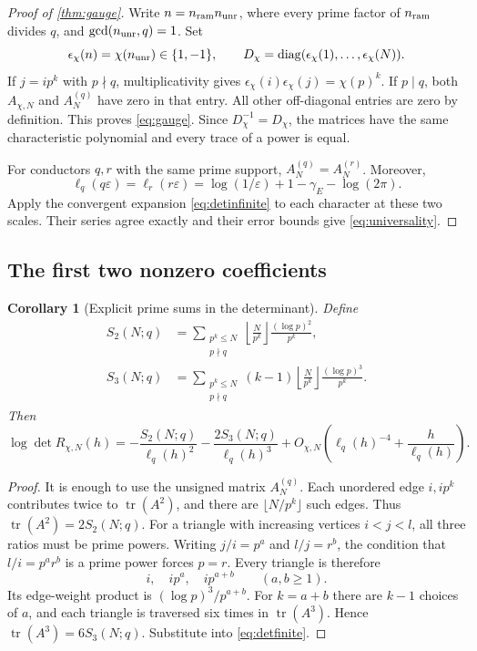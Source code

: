 \documentclass[11pt]{article}
\newtheorem{corollary}[theorem]{Corollary}
\theoremstyle{definition}
\newcommand{\tr}{\operatorname{tr}}
\newcommand{\diag}{\operatorname{diag}}
\newcommand{\gE}{\gamma_{\!E}}
\begin{document}
\begin{proof}[Proof of \cref{thm:gauge}]
Write $n=n_{\rm ram}n_{\rm unr}$, where every prime factor of $n_{\rm ram}$
divides $q$, and $\gcd(n_{\rm unr},q)=1$. Set
\[
 \epsilon_\chi(n)=\chi(n_{\rm unr})\in\{1,-1\},\qquad
 D_\chi=\diag(\epsilon_\chi(1),\ldots,\epsilon_\chi(N)).
\]
If $j=i p^k$ with $p\nmid q$, multiplicativity gives
$\epsilon_\chi(i)\epsilon_\chi(j)=\chi(p)^k$.
If $p\mid q$, both $A_{\chi,N}$ and $A_N^{(q)}$ have zero in that entry.
All other off-diagonal entries are zero by definition. This proves
\cref{eq:gauge}. Since $D_\chi^{-1}=D_\chi$, the matrices have the same
characteristic polynomial and every trace of a power is equal.

For conductors $q,r$ with the same prime support, $A_N^{(q)}=A_N^{(r)}$.
Moreover,
\[
 \ell_q(q\varepsilon)=\ell_r(r\varepsilon)
 =\log(1/\varepsilon)+1-\gE-\log(2\pi).
\]
Apply the convergent expansion \cref{eq:detinfinite} to each character at these
two scales. Their series agree exactly and their error bounds give
\cref{eq:universality}.
\end{proof}

\subsection{The first two nonzero coefficients}

\begin{corollary}[Explicit prime sums in the determinant]\label{cor:coeff}
Define
\begin{align*}
 S_2(N;q)&=\sum_{\substack{p^k\le N\\p\nmid q}}
       \left\lfloor\frac N{p^k}\right\rfloor\frac{(\log p)^2}{p^k},\\
 S_3(N;q)&=\sum_{\substack{p^k\le N\\p\nmid q}}
       (k-1)\left\lfloor\frac N{p^k}\right\rfloor\frac{(\log p)^3}{p^k}.
\end{align*}
Then
\begin{equation}\label{eq:firstcoeff}
 \log\det R_{\chi,N}(h)
 =-\frac{S_2(N;q)}{\ell_q(h)^2}
  -\frac{2S_3(N;q)}{\ell_q(h)^3}
  +O_{\chi,N}\left(\ell_q(h)^{-4}+\frac h{\ell_q(h)}\right).
\end{equation}
\end{corollary}

\begin{proof}
It is enough to use the unsigned matrix $A_N^{(q)}$.
Each unordered edge $i,ip^k$ contributes twice to $\tr(A^2)$, and there are
$\lfloor N/p^k\rfloor$ such edges. Thus $\tr(A^2)=2S_2(N;q)$.
For a triangle with increasing vertices $i<j<l$, all three ratios must be
prime powers. Writing $j/i=p^a$ and $l/j=r^b$, the condition that
$l/i=p^ar^b$ is a prime power forces $p=r$. Every triangle is therefore
\[
 i,\quad ip^a,\quad ip^{a+b}\qquad(a,b\ge1).
\]
Its edge-weight product is $(\log p)^3/p^{a+b}$. For $k=a+b$ there are $k-1$
choices of $a$, and each triangle is traversed six times in $\tr(A^3)$.
Hence $\tr(A^3)=6S_3(N;q)$. Substitute into \cref{eq:detfinite}.
\end{proof}
\end{document}
